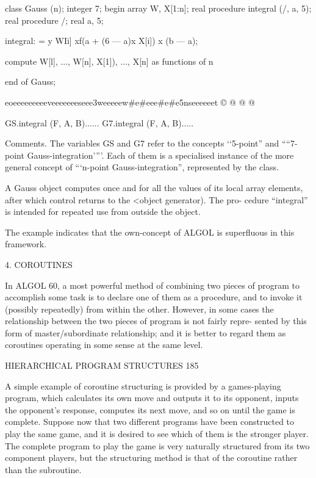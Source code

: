 class Gauss (n); integer 7; begin array W, X[1:n]; real procedure integral (/, a, 5); real procedure /; real a, 5;

integral: = y WIi] xf(a + (6 — a)x X[i]) x (b — a);

compute W[l], ..., W[n], X[1]), ..., X[n] as functions of n

end of Gauss;

eoeeeeeeeeeveeeeeeeseee3weeeeew#e#eee#e#e5nseeeeeet © @ @ @

GS.integral (F, A, B)...... G7.integral (F, A, B).....

Comments. The variables GS and G7 refer to the concepts ‘‘5-point” and ““7-point Gauss-integration’”’. Each of them is a specialised instance of the more general concept of “‘n-point Gauss-integration”, represented by the class.

A Gauss object computes once and for all the values of its local array elements, after which control returns to the <object generator). The pro- cedure “integral” is intended for repeated use from outside the object.

The example indicates that the own-concept of ALGOL is superfluous in this framework.

4. COROUTINES

In ALGOL 60, a most powerful method of combining two pieces of program to accomplish some task is to declare one of them as a procedure, and to invoke it (possibly repeatedly) from within the other. However, in some cases the relationship between the two pieces of program is not fairly repre- sented by this form of master/subordinate relationship; and it is better to regard them as coroutines operating in some sense at the same level.

HIERARCHICAL PROGRAM STRUCTURES 185

A simple example of coroutine structuring is provided by a games-playing program, which calculates its own move and outputs it to its opponent, inputs the opponent’s response, computes its next move, and so on until the game is complete. Suppose now that two different programs have been constructed to play the same game, and it is desired to see which of them is the stronger player. The complete program to play the game is very naturally structured from its two component players, but the structuring method is that of the coroutine rather than the subroutine.

